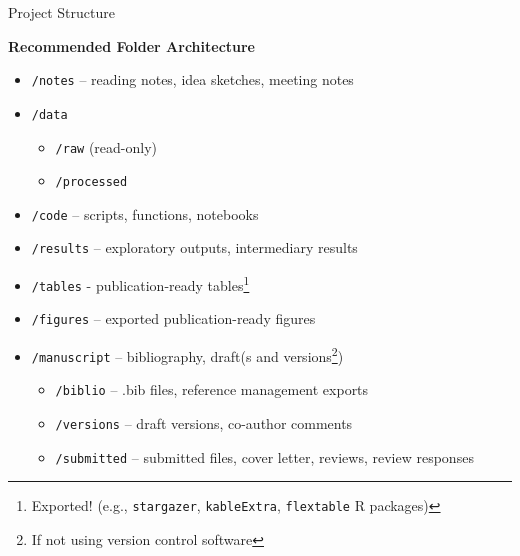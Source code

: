 \documentclass{beamer}
\begin{document}
\begin{frame}{Project Structure}

\vspace{0.5em}

\textbf{Recommended Folder Architecture}
    \scriptsize
    \begin{itemize}
        \item \texttt{/notes} – reading notes, idea sketches, meeting notes
        \item \texttt{/data}
            \begin{itemize}
                \scriptsize
                \item \texttt{/raw} (read-only)
                \item \texttt{/processed}
            \end{itemize}
        \item \texttt{/code} – scripts, functions, notebooks
        \item \texttt{/results} – exploratory outputs, intermediary results
        \item \texttt{/tables} - publication-ready tables\footnote{Exported!  (e.g., \texttt{stargazer}, \texttt{kableExtra}, \texttt{flextable} R packages)}
        \item \texttt{/figures} – exported publication-ready figures
        \item \texttt{/manuscript} – bibliography, draft(s and versions\footnote{If not using version control software})
            \begin{itemize}
                \scriptsize
                \item \texttt{/biblio} – .bib files, reference management exports
                \item \texttt{/versions} – draft versions, co-author comments
                \item \texttt{/submitted} – submitted files, cover letter, reviews, review responses
            \end{itemize}
    \end{itemize}

\end{frame}

\end{document}

